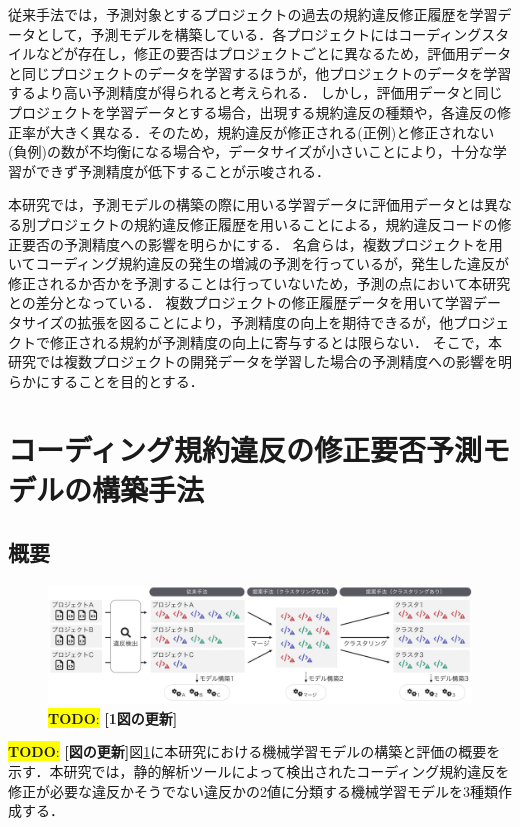\documentclass[paper]{ieicej}
\newcommand{\todo}[1]{\colorbox{yellow}{{\bf TODO}:}{\color{red} {\textbf{[#1]}}}}
\begin{document}
従来手法では，予測対象とするプロジェクトの過去の規約違反修正履歴を学習データとして，予測モデルを構築している．各プロジェクトにはコーディングスタイルなどが存在し，修正の要否はプロジェクトごとに異なるため，評価用データと同じプロジェクトのデータを学習するほうが，他プロジェクトのデータを学習するより高い予測精度が得られると考えられる．
しかし，評価用データと同じプロジェクトを学習データとする場合，出現する規約違反の種類や，各違反の修正率が大きく異なる\cite{Panichella}．そのため，規約違反が修正される(正例)と修正されない(負例)の数が不均衡になる場合や，データサイズが小さいことにより，十分な学習ができず予測精度が低下することが示唆される．

本研究では，予測モデルの構築の際に用いる学習データに評価用データとは異なる別プロジェクトの規約違反修正履歴を用いることによる，規約違反コードの修正要否の予測精度への影響を明らかにする．
名倉らは，複数プロジェクトを用いてコーディング規約違反の発生の増減の予測を行っているが，発生した違反が修正されるか否かを予測することは行っていないため，予測の点において本研究との差分となっている\cite{nagura}．
複数プロジェクトの修正履歴データを用いて学習データサイズの拡張を図ることにより，予測精度の向上を期待できるが，他プロジェクトで修正される規約が予測精度の向上に寄与するとは限らない．
そこで，本研究では複数プロジェクトの開発データを学習した場合の予測精度への影響を明らかにすることを目的とする．

\section{コーディング規約違反の修正要否予測モデルの構築手法}\label{chap:approach}

\subsection{概要}

\begin{figure}[t]
	\centering
	\includegraphics[width=0.8\linewidth]{fig/kameoka_fig1.pdf}
	\caption{\todo{1図の更新}}
	\label{fig:Teiannsyuhou}
\end{figure}

\todo{図の更新}図\ref{fig:Teiannsyuhou}に本研究における機械学習モデルの構築と評価の概要を示す．本研究では，静的解析ツールによって検出されたコーディング規約違反を修正が必要な違反かそうでない違反かの2値に分類する機械学習モデルを3種類作成する．
\end{document}
